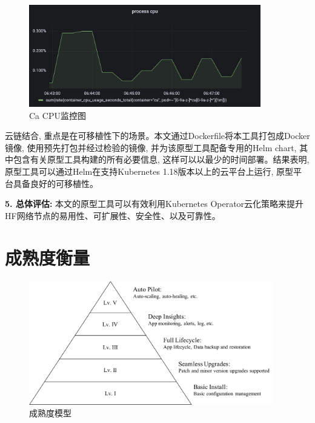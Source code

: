\begin{figure}[h] %
    \centering %
    \includegraphics[width=0.9\textwidth]{FIGs/chapter6/ca_cpu.png} %
    \caption{Ca CPU监控图} %
    \label{monitoring} %
\end{figure}%

云链结合, 重点是在可移植性下的场景。本文通过Dockerfile将本工具打包成Docker镜像\footnotemark[1], 使用预先打包并经过检验的镜像, 并为该原型工具配备专用的Helm chart, 其中包含有关原型工具构建的所有必要信息, 这样可以以最少的时间部署。结果表明, 原型工具可以通过Helm在支持Kubernetes 1.18版本以上的云平台上运行, 原型平台具备良好的可移植性。

\textbf{5. 总体评估: }本文的原型工具可以有效利用Kubernetes Operator云化策略来提升HF网络节点的易用性、可扩展性、安全性、以及可靠性。


\section{成熟度衡量}

\begin{figure}[h] %
    \centering %
    \includegraphics[width=0.95\textwidth]{FIGs/chapter6/maturity.pdf} %
    \caption{成熟度模型} %
    \label{maturity} %
\end{figure}%


